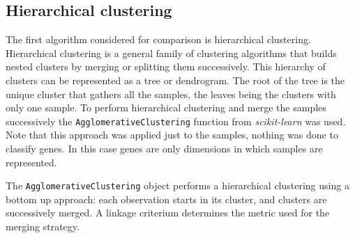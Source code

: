 \subsection{Hierarchical clustering}\label{sec:hc}
The first algorithm considered for comparison is hierarchical clustering. Hierarchical clustering is a general family of clustering algorithms that builds nested clusters by merging or splitting them successively. This hierarchy of clusters can be represented as a tree or dendrogram. The root of the tree is the unique cluster that gathers all the samples, the leaves being the clusters with only one sample. To perform hierarchical clustering and merge the samples successively the \texttt{AgglomerativeClustering} function from \textit{scikit-learn} was used. Note that this approach was applied just to the samples, nothing was done to classify genes. In this case genes are only dimensions in which samples are represented.

The \texttt{AgglomerativeClustering} object performs a hierarchical clustering using a bottom up approach: each observation starts in its cluster, and clusters are successively merged. A linkage criterium determines the metric used for the merging strategy. 

